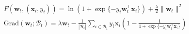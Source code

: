 \documentclass[11pt]{article}
\newcommand{\uw}{\textbf{w}^{U}}
\newcommand{\w}{\textbf{w}}
\newcommand{\x}{\textbf{x}}
\newcommand{\y}{y}
\newcommand{\miniB}{\mathscr{B}}
\begin{document}
\begin{small}

\begin{align}
    & F\left(\w_{t}, (\x_i,\y_i)\right) = \ln (1+\exp\{-\y_i\w^\top_t\x_i\}) + \frac{\lambda}{2}\|\w_t\|^2 \\
    \label{eq: logistic_regression_grad}
    & \text{Grad}(\w_t; \miniB_t) = \lambda\w_t -  \frac{1}{|\miniB_t|}\sum\nolimits_{i \in \miniB_{t}} \y_i\x_i (1-\frac{1}{1+\exp\{-y_i\w_{t}^\top\x_i\}})
\end{align}
\end{small}



\end{document}
